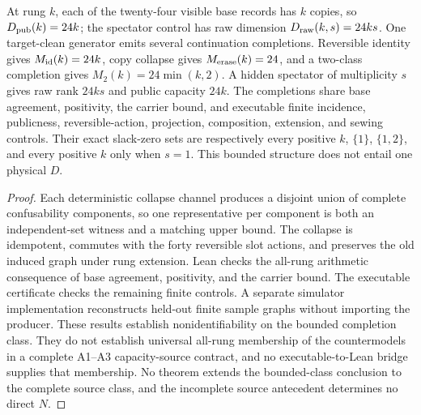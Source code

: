 \begin{theorem}
\label{thm:capacity-protocol-nonidentifiability}
At rung \(k\), each of the twenty-four visible base records has \(k\) copies,
so \(D_{\rm pub}(k)=24k\); the spectator control has raw dimension
\(D_{\rm raw}(k,s)=24ks\). One target-clean generator emits several
continuation completions. Reversible identity gives
\(M_{\rm id}(k)=24k\), copy collapse gives \(M_{\rm erase}(k)=24\), and a
two-class completion gives \(M_2(k)=24\min(k,2)\). A hidden spectator of
multiplicity \(s\) gives raw rank \(24ks\) and public capacity \(24k\). The
completions share base agreement, positivity, the carrier bound, and
executable finite incidence, publicness, reversible-action, projection,
composition, extension, and sewing controls. Their exact slack-zero sets
are respectively every positive \(k\), \(\{1\}\), \(\{1,2\}\), and every
positive \(k\) only when \(s=1\). This bounded structure does not entail one
physical \(D\).
\end{theorem}

\begin{proof}
Each deterministic collapse channel produces a disjoint union of complete
confusability components, so one representative per component is both an
independent-set witness and a matching upper bound. The collapse is
idempotent, commutes with the forty reversible slot actions, and preserves the
old induced graph under rung extension. Lean checks the all-rung arithmetic
consequence of base agreement, positivity, and the carrier bound. The
executable certificate checks the remaining finite controls. A separate
simulator implementation reconstructs held-out finite sample graphs without
importing the producer. These results establish nonidentifiability on the
bounded completion class. They do not establish
universal all-rung membership of the countermodels in a complete A1--A3
capacity-source contract, and no executable-to-Lean bridge supplies that
membership. No theorem extends the bounded-class conclusion to the complete
source class, and the incomplete source antecedent determines no direct \(N\).
\end{proof}

